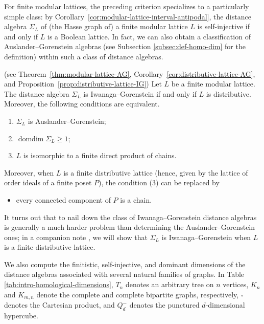 \documentclass[a4paper,leqno]{amsart}
\begin{document}
For finite modular lattices, the preceding criterion specializes to a particularly simple class: by Corollary~\ref{cor:modular-lattice-interval-antipodal}, the distance algebra $\Sigma_L$ of (the Hasse graph of) a finite modular lattice $L$ is self-injective if and only if $L$ is a Boolean lattice.  
In fact, we can also obtain a classification of Auslander--Gorenstein algebras (see Subsection \ref{subsec:def-homo-dim} for the definition) within such a class of distance algebras.

\begin{thm}\textnormal{(see Theorem~\ref{thm:modular-lattice-AG},
Corollary~\ref{cor:distributive-lattice-AG}, and Proposition~\ref{prop:distributive-lattice-IG})}
Let $L$ be a finite modular lattice.  The distance algebra $\Sigma_L$ is Iwanaga--Gorenstein if and only if $L$ is distributive. Moreover, the following conditions are equivalent.
\begin{enumerate}
    \item $\Sigma_L$ is Auslander--Gorenstein;
    \item $\operatorname{domdim}\Sigma_L\geq1$;
    \item $L$ is isomorphic to a finite direct product of chains.
\end{enumerate}
Moreover, when $L$ is a finite distributive lattice (hence, given by the lattice of order ideals of a finite poset $P$), the condition (3) can be replaced by
\begin{itemize}
    \item[\rm(3')] every connected component of $P$ is a chain.
\end{itemize}
\end{thm}

It turns out that to nail down the class of Iwanaga--Gorenstein distance algebras is generally a much harder problem than determining the Auslander--Gorenstein ones; in a companion note \cite{CX2026}, we will show that $\Sigma_L$ is Iwanaga--Gorenstein when $L$ is a finite distributive lattice.

\medskip 

We also compute the finitistic, self-injective, and dominant dimensions of the distance algebras associated with several natural families of graphs.  In Table \ref{tab:intro-homological-dimensions}, $T_n$ denotes an arbitrary tree on $n$ vertices, $K_n$ and $K_{m,n}$ denote the complete and complete bipartite graphs, respectively, $\square$ denotes the Cartesian product, and $Q_d^-$ denotes the punctured $d$-dimensional hypercube.
\end{document}
